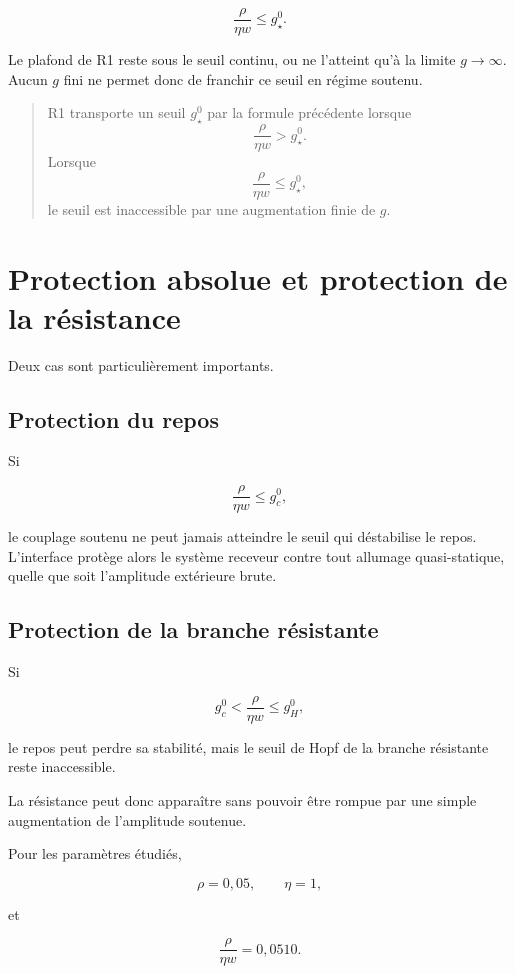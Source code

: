 \[
\frac{\rho}{\eta w}
\leq
g_\star^0.
\]

Le plafond de R1 reste sous le seuil continu, ou ne l'atteint qu'à la
limite \(g\to\infty\). Aucun \(g\) fini ne permet donc de franchir ce
seuil en régime soutenu.

\begin{quote}
R1 transporte un seuil \(g_\star^0\) par la formule précédente lorsque
\[
\frac{\rho}{\eta w}>g_\star^0.
\]
Lorsque
\[
\frac{\rho}{\eta w}\leq g_\star^0,
\]
le seuil est inaccessible par une augmentation finie de \(g\).
\end{quote}

\section{Protection absolue et protection de la résistance}
\label{annexe-r1-protection}

Deux cas sont particulièrement importants.

\subsection{Protection du repos}

Si

\[
\frac{\rho}{\eta w}
\leq
g_c^0,
\]

le couplage soutenu ne peut jamais atteindre le seuil qui déstabilise
le repos. L'interface protège alors le système receveur contre tout
allumage quasi-statique, quelle que soit l'amplitude extérieure brute.

\subsection{Protection de la branche résistante}

Si

\[
g_c^0
<
\frac{\rho}{\eta w}
\leq
g_H^0,
\]

le repos peut perdre sa stabilité, mais le seuil de Hopf de la branche
résistante reste inaccessible.

La résistance peut donc apparaître sans pouvoir être rompue par une
simple augmentation de l'amplitude soutenue.

Pour les paramètres étudiés,

\[
\rho=0{,}05,
\qquad
\eta=1,
\]

et

\[
\frac{\rho}{\eta w}
=
0{,}0510.
\]

